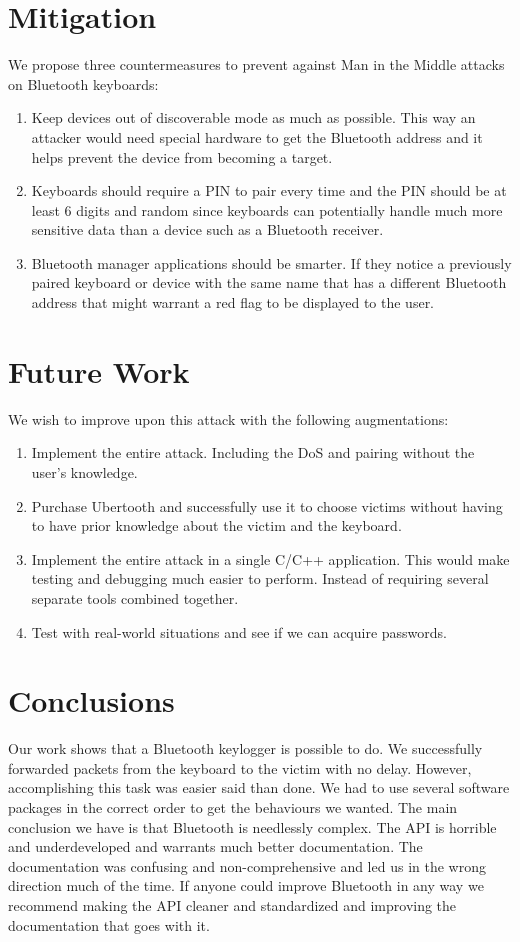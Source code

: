 \documentclass{acm_proc_article-sp}
\begin{document}
\section{Mitigation}
We propose three countermeasures to prevent against Man in the Middle attacks on Bluetooth keyboards:
\begin{enumerate}
\item Keep devices out of discoverable mode as much as possible. This way an attacker would need special hardware to get the Bluetooth address and it helps prevent the device from becoming a target.
\item Keyboards should require a PIN to pair every time and the PIN should be at least 6 digits and random since keyboards can potentially handle much more sensitive data than a device such as a Bluetooth receiver.
\item Bluetooth manager applications should be smarter. If they notice a previously paired keyboard or device with the same name that has a different Bluetooth address that might warrant a red flag to be displayed to the user.
\end{enumerate}

\section{Future Work}
We wish to improve upon this attack with the following augmentations:
\begin{enumerate}
\item Implement the entire attack. Including the DoS and pairing without the user's knowledge.
\item  Purchase Ubertooth and successfully use it to choose victims without having to have prior knowledge about the victim and the keyboard.
\item Implement the entire attack in a single C/C++ application. This would make testing and debugging much easier to perform. Instead of requiring several separate tools combined together.
\item Test with real-world situations and see if we can acquire passwords.
\end{enumerate}

\section{Conclusions}
Our work shows that a Bluetooth keylogger is possible to do. We successfully forwarded packets from the keyboard to the victim with no delay. However, accomplishing this task was easier said than done. We had to use several software packages in the correct order to get the behaviours we wanted. The main conclusion we have is that Bluetooth is needlessly complex. The API is horrible and underdeveloped and warrants much better documentation.  The documentation was confusing and non-comprehensive and led us in the wrong direction much of the time. If anyone could improve Bluetooth in any way we recommend making the API cleaner and standardized and improving the documentation that goes with it.

%


\balancecolumns
\end{document}
